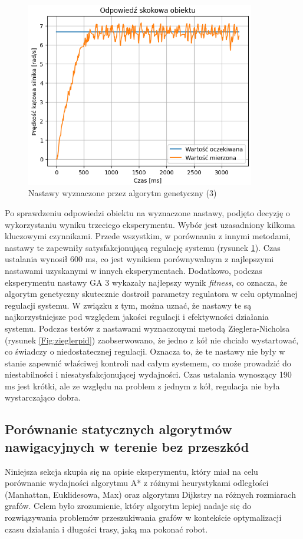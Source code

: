 \documentclass[12pt,twoside]{article}
\begin{document}
\begin{figure}[ht]%
 \centering%
 \includegraphics[width=10cm]{figures/PID/exp3pid.png}%
 \caption{Nastawy wyznaczone przez algorytm genetyczny (3)}%
 \label{Fig:exp3pid}%
\end{figure}

\clearpage

Po sprawdzeniu odpowiedzi obiektu na wyznaczone nastawy, podjęto decyzję o wykorzystaniu wyniku trzeciego eksperymentu. Wybór jest uzasadniony kilkoma kluczowymi czynnikami. Przede wszystkim, w porównaniu z innymi metodami, nastawy te zapewniły satysfakcjonującą regulację systemu (rysunek \ref{Fig:exp3pid}). Czas ustalania wynosił 600 ms, co jest wynikiem porównywalnym z najlepszymi nastawami uzyskanymi w innych eksperymentach. Dodatkowo, podczas eksperymentu nastawy GA 3 wykazały najlepszy wynik \textit{fitness}, co oznacza, że algorytm genetyczny skutecznie dostroił parametry regulatora w celu optymalnej regulacji systemu. W związku z tym, można uznać, że nastawy te są najkorzystniejsze pod względem jakości regulacji i efektywności działania systemu. Podczas testów z nastawami wyznaczonymi metodą Zieglera-Nicholsa (rysunek \ref{Fig:zieglerpid}) zaobserwowano, że jedno z kół nie chciało wystartować, co świadczy o niedostatecznej regulacji. Oznacza to, że te nastawy nie były w stanie zapewnić właściwej kontroli nad całym systemem, co może prowadzić do niestabilności i niesatysfakcjonującej wydajności. Czas ustalania wynoszący 190 ms jest krótki, ale ze względu na problem z jednym z kół, regulacja nie była wystarczająco dobra.



\subsection{Porównanie statycznych algorytmów nawigacyjnych w terenie bez przeszkód}
Niniejsza sekcja skupia się na opisie eksperymentu, który miał na celu porównanie wydajności algorytmu A* z różnymi heurystykami odległości (Manhattan, Euklidesowa, Max) oraz algorytmu Dijkstry na różnych rozmiarach grafów. Celem było zrozumienie, który algorytm lepiej nadaje się do rozwiązywania problemów przeszukiwania grafów w kontekście optymalizacji czasu działania i długości trasy, jaką ma pokonać robot. 
\end{document}
